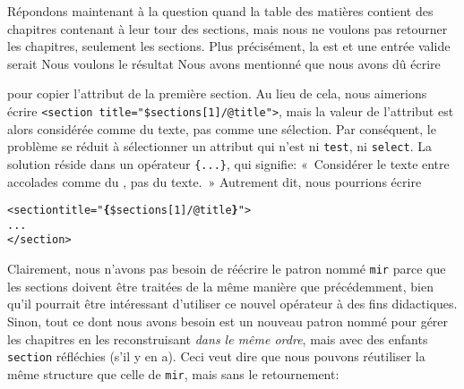 Répondons maintenant à la question quand la table des matières
contient des chapitres contenant à leur tour des sections, mais
nous ne voulons pas retourner les chapitres, seulement les
sections. Plus précisément, la \DTD est
\noindent et une entrée valide serait
\noindent Nous voulons le résultat
\noindent Nous avons mentionné que nous avons dû écrire
pour copier l'attribut de la première section. Au lieu de cela, nous
aimerions écrire \texttt{<section title="\$sections[1]/@title">}, mais
la valeur de l'attribut est alors considérée comme du texte, pas comme
une sélection. Par conséquent, le problème se réduit à sélectionner un
attribut qui n'est ni \texttt{test}, ni \texttt{select}. La solution
réside dans un opérateur \XPath \texttt{\{...\}}, qui signifie:
«~Considérer le texte entre accolades comme du \XPath, pas du texte.~»
Autrement dit, nous pourrions écrire
\begin{alltt}
\small      <section title="\textbf{\{}\$sections[1]/@title\textbf{\}}">
        ...
      </section>
\end{alltt}
Clairement, nous n'avons pas besoin de réécrire le patron nommé
\texttt{mir} parce que les sections doivent être traitées de la même
manière que précédemment, bien qu'il pourrait être intéressant
d'utiliser ce nouvel opérateur \XPath à des fins didactiques. Sinon,
tout ce dont nous avons besoin est un nouveau patron nommé pour gérer
les chapitres en les reconstruisant \emph{dans le même ordre}, mais
avec des enfants \texttt{section} réfléchies (s'il y en a). Ceci veut
dire que nous pouvons réutiliser la même structure que celle de
\texttt{mir}, mais sans le retournement:

